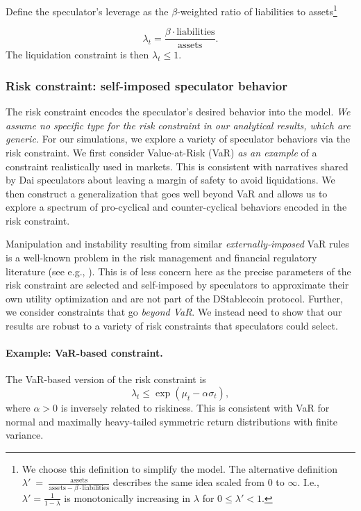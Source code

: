 Define the speculator's leverage as the $\beta$-weighted ratio of liabilities to assets\footnote{We choose this definition to simplify the model. The alternative definition $\lambda'~=~\frac{\text{assets}}{\text{assets} - \beta\cdot\text{liabilities}}$ describes the same idea scaled from 0 to $\infty$. I.e., $\lambda' = \frac{1}{1-\lambda}$ is monotonically increasing in $\lambda$ for $0\leq \lambda' < 1$.}

$$\lambda_t = \frac{\beta \cdot \text{liabilities}}{\text{assets}}.$$
The liquidation constraint is then $\lambda_t \leq 1$.



\subsubsection{Risk constraint: self-imposed speculator behavior}
The risk constraint encodes the speculator's desired behavior into the model. \emph{We assume no specific type for the risk constraint in our analytical results, which are generic.} For our simulations, we explore a variety of speculator behaviors via the risk constraint. We first consider Value-at-Risk (VaR) \emph{as an example} of a constraint realistically used in markets. This is consistent with narratives shared by Dai speculators about leaving a margin of safety to avoid liquidations. We then construct a generalization that goes well beyond VaR and allows us to explore a spectrum of pro-cyclical and counter-cyclical behaviors encoded in the risk constraint.

Manipulation and instability resulting from similar \emph{externally-imposed} VaR rules is a well-known problem in the risk management and financial regulatory literature (see e.g., \cite{farmer2015}). This is of less concern here as the precise parameters of the risk constraint are selected and self-imposed by speculators to approximate their own utility optimization and are not part of the DStablecoin protocol. Further, we consider constraints that go \emph{beyond VaR}. We instead need to show that our results are robust to a variety of risk constraints that speculators could select.

\paragraph{Example: VaR-based constraint.}
The VaR-based version of the risk constraint is
$$\lambda_t \leq \exp(\mu_t - \alpha \sigma_t),$$
where $\alpha>0$ is inversely related to riskiness. This is consistent with VaR for normal and maximally heavy-tailed symmetric return distributions with finite variance.

